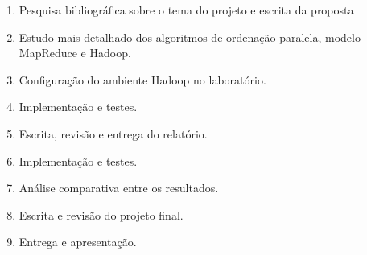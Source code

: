 \begin{enumerate}
 \item \label{c1} Pesquisa bibliográfica sobre o tema do projeto e escrita da proposta
 \item \label{c2} Estudo mais detalhado dos algoritmos de ordenação paralela,  modelo MapReduce e Hadoop.
 \item \label{c3} Configuração do ambiente Hadoop no laboratório.
 \item \label{c4} Implementação e testes.
 \item \label{c5} Escrita, revisão e entrega do relatório. 
 \item \label{c6} Implementação e testes.
 \item \label{c7} Análise comparativa entre os resultados.
 \item \label{c8} Escrita e revisão do projeto final.
 \item \label{c9} Entrega e apresentação.
 \end{enumerate}
 

